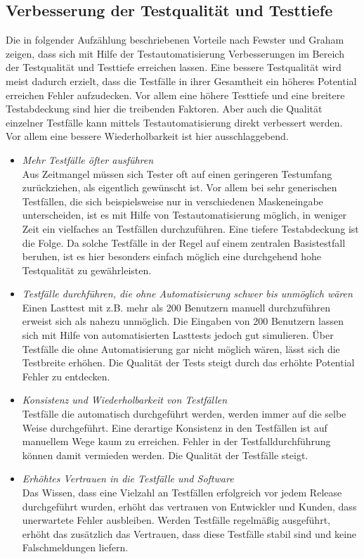 \subsection{Verbesserung der Testqualität und Testtiefe}
\label{sec:verbesserung_der_testqualität_und_testtiefe}
Die in folgender Aufzählung beschriebenen Vorteile nach Fewster und Graham \cite[vgl. S. 9 ff.]{fewster_software_1999} zeigen, dass sich mit Hilfe der Testautomatisierung Verbesserungen im Bereich der Testqualität und Testtiefe erreichen lassen. Eine bessere Testqualität wird meist dadurch erzielt, dass die Testfälle in ihrer Gesamtheit ein höheres Potential erreichen Fehler aufzudecken. Vor allem eine höhere Testtiefe und eine breitere Testabdeckung sind hier die treibenden Faktoren. Aber auch die Qualität einzelner Testfälle kann mittels Testautomatisierung direkt verbessert werden. Vor allem eine bessere Wiederholbarkeit ist hier ausschlaggebend.


\begin{itemize}
\item \textit{Mehr Testfälle öfter ausführen} \\
Aus Zeitmangel müssen sich Tester oft auf einen geringeren Testumfang zurückziehen, als eigentlich gewünscht ist. Vor allem bei sehr generischen Testfällen, die sich beispielsweise nur in verschiedenen Maskeneingabe unterscheiden, ist es mit Hilfe von Testautomatisierung möglich, in weniger Zeit ein vielfaches an Testfällen durchzuführen.
Eine tiefere Testabdeckung ist die Folge. Da solche Testfälle in der Regel auf einem zentralen Basistestfall beruhen, ist es hier besonders einfach möglich eine durchgehend hohe Testqualität zu gewährleisten.
\item \textit{Testfälle durchführen, die ohne Automatisierung schwer bis unmöglich wären} \\
Einen Lasttest mit z.B. mehr als 200 Benutzern manuell durchzuführen erweist sich als nahezu unmöglich. Die Eingaben von 200 Benutzern lassen sich mit Hilfe von automatisierten Lasttests jedoch gut simulieren. Über Testfälle die ohne Automatisierung gar nicht möglich wären, lässt sich die Testbreite erhöhen. Die Qualität der Tests steigt durch das erhöhte Potential Fehler zu entdecken.
\item \textit{Konsistenz und Wiederholbarkeit von Testfällen} \\
Testfälle die automatisch durchgeführt werden, werden immer auf die selbe Weise durchgeführt. Eine derartige Konsistenz in den Testfällen ist auf manuellem Wege kaum zu erreichen. Fehler in der Testfalldurchführung können damit vermieden werden. Die Qualität der Testfälle steigt. 
\item \textit{Erhöhtes Vertrauen in die Testfälle und Software } \\
Das Wissen, dass eine Vielzahl an Testfällen erfolgreich vor jedem Release durchgeführt wurden, erhöht das vertrauen von Entwickler und Kunden, dass unerwartete Fehler ausbleiben.
Werden Testfälle regelmäßig ausgeführt, erhöht das zusätzlich das Vertrauen, dass diese Testfälle stabil sind und keine Falschmeldungen liefern.
\end{itemize}


